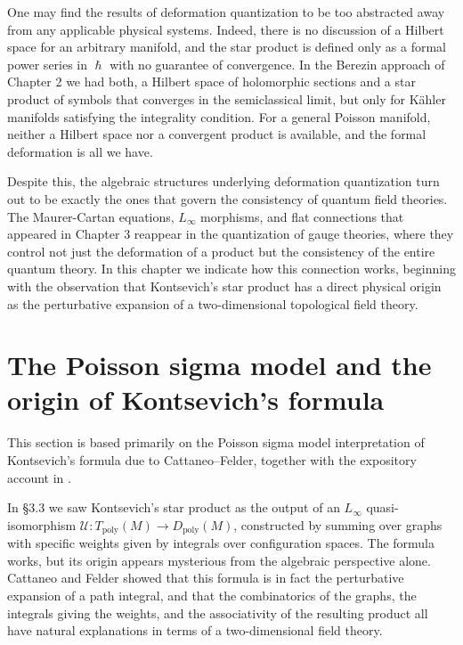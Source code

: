 \documentclass[
  12pt,
  a4paper, oneside
]{report}
\renewcommand{\hbar}{\hslash}
\theoremstyle{bolddef}
\theoremstyle{remark}
\numberwithin{equation}{chapter}
\begin{document}
One may find the results of deformation quantization to be too abstracted away from any applicable physical systems. Indeed, there is no discussion of a Hilbert space for an arbitrary manifold, and the star product is defined only as a formal power series in $\hbar$ with no guarantee of convergence. In the Berezin approach of Chapter 2 we had both, a Hilbert space of holomorphic sections and a star product of symbols that converges in the semiclassical limit, but only for K\"ahler manifolds satisfying the integrality condition. For a general Poisson manifold, neither a Hilbert space nor a convergent product is available, and the formal deformation is all we have.

Despite this, the algebraic structures underlying deformation quantization turn out to be exactly the ones that govern the consistency of quantum field theories. The Maurer-Cartan equations, $L_\infty$ morphisms, and flat connections that appeared in Chapter 3 reappear in the quantization of gauge theories, where they control not just the deformation of a product but the consistency of the entire quantum theory. In this chapter we indicate how this connection works, beginning with the observation that Kontsevich's star product has a direct physical origin as the perturbative expansion of a two-dimensional topological field theory.


\section{The Poisson sigma model and the origin of Kontsevich's formula}
This section is based primarily on the Poisson sigma model interpretation of Kontsevich's formula due to Cattaneo--Felder, together with the expository account in \cite{CF-PSM,GraciaSaz2003}.


In \S 3.3 we saw Kontsevich's star product as the output of an $L_\infty$ quasi-isomorphism $\mathcal{U} : T_{\mathrm{poly}}(M) \to D_{\mathrm{poly}}(M)$, constructed by summing over graphs with specific weights given by integrals over configuration spaces. The formula works, but its origin appears mysterious from the algebraic perspective alone. Cattaneo and Felder \cite{CF-PSM} \cite[for an introduction]{GraciaSaz2003} showed that this formula is in fact the perturbative expansion of a path integral, and that the combinatorics of the graphs, the integrals giving the weights, and the associativity of the resulting product all have natural explanations in terms of a two-dimensional field theory.
\end{document}
